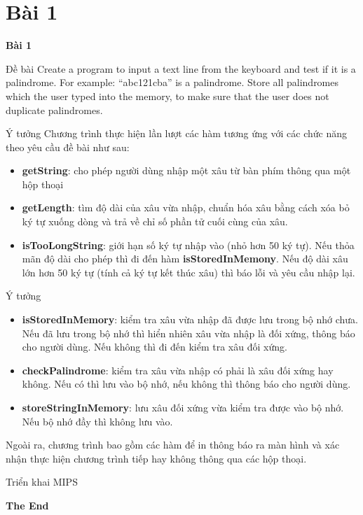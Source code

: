 \documentclass[aspectratio=43,xcolor=dvipsnames]{beamer}
\begin{document}
\section{Bài 1}
\begin{frame}
    \textcolor{structure}{\Huge{\centerline{\textbf{Bài 1}}}}
\end{frame}
\begin{frame}{Đề bài}
Create a program to input a text line from the keyboard and test if it is a
palindrome. For example: “abc121cba” is a palindrome. Store all palindromes which
the user typed into the memory, to make sure that the user does not duplicate
palindromes.
\end{frame}
\begin{frame}{Ý tưởng}
Chương trình thực hiện lần lượt các hàm tương ứng với các chức năng theo yêu cầu đề bài như sau:
\pause
\begin{itemize}
    \item \textbf{getString}: cho phép người dùng nhập một xâu từ bàn phím thông qua một hộp thoại
    \pause
    \item \textbf{getLength}: tìm độ dài của xâu vừa nhập, chuẩn hóa xâu bằng cách xóa bỏ ký tự xuống dòng và trả về chỉ số phần tử cuối cùng của xâu.
    \pause
    \item \textbf{isTooLongString}: giới hạn số ký tự nhập vào (nhỏ hơn 50 ký tự). Nếu thỏa mãn độ dài cho phép thì đi đến hàm \textbf{isStoredInMemony}. Nếu độ dài xâu lớn hơn 50 ký tự (tính cả ký tự kết thúc xâu) thì báo lỗi và yêu cầu nhập lại. 
\end{itemize}
\end{frame}
\begin{frame}{Ý tưởng}
\begin{itemize}
    \item \textbf{isStoredInMemory}: kiểm tra xâu vừa nhập đã được lưu trong bộ nhớ chưa. Nếu đã lưu trong bộ nhớ thì hiển nhiên xâu vừa nhập là đối xứng, thông báo cho người dùng. Nếu không thì đi đến kiểm tra xâu đối xứng.
    \pause
    \item \textbf{checkPalindrome}: kiểm tra xâu vừa nhập có phải là xâu đối xứng hay không. Nếu có thì lưu vào bộ nhớ, nếu không thì thông báo cho người dùng.
    \pause
    \item \textbf{storeStringInMemory}: lưu xâu đối xứng vừa kiểm tra được vào bộ nhớ. Nếu bộ nhớ đầy thì không lưu vào.
    \pause
\end{itemize}
Ngoài ra, chương trình bao gồm các hàm để in thông báo ra màn hình và xác nhận thực hiện chương trình tiếp hay không thông qua các hộp thoại.
\end{frame}
\begin{frame}{Triển khai MIPS}
    
\end{frame}
\begin{frame}
    \textcolor{structure}{\Huge{\centerline{\textbf{The End}}}}
\end{frame}
\end{document}
